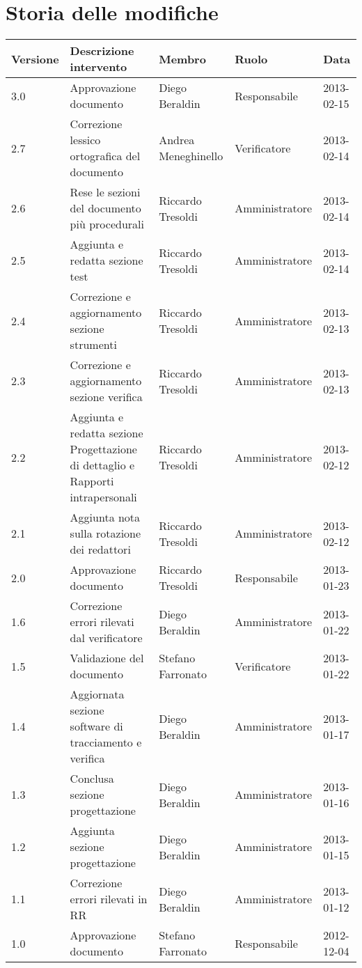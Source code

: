 \section*{Storia delle modifiche}
\begin{tabularx}{\textwidth}{lXlll}
\toprule
Versione & Descrizione intervento & Membro & Ruolo & Data\\
\midrule %


3.0 & Approvazione documento & Diego Beraldin & Responsabile & 2013-02-15\\
2.7 & Correzione lessico ortografica del documento & Andrea Meneghinello & Verificatore & 2013-02-14\\
2.6 & Rese le sezioni del documento più procedurali & Riccardo Tresoldi & Amministratore & 2013-02-14\\
2.5 & Aggiunta e redatta sezione test & Riccardo Tresoldi & Amministratore & 2013-02-14\\
2.4 & Correzione e aggiornamento sezione strumenti & Riccardo Tresoldi & Amministratore & 2013-02-13\\
2.3 & Correzione e aggiornamento sezione verifica & Riccardo Tresoldi & Amministratore & 2013-02-13\\
2.2 & Aggiunta e redatta sezione Progettazione di dettaglio e Rapporti intrapersonali & Riccardo Tresoldi & Amministratore & 2013-02-12\\
2.1 & Aggiunta nota sulla rotazione dei redattori & Riccardo Tresoldi & Amministratore & 2013-02-12\\
2.0 & Approvazione documento & Riccardo Tresoldi & Responsabile & 2013-01-23\\
1.6 & Correzione errori rilevati dal verificatore & Diego Beraldin & Amministratore & 2013-01-22\\
1.5 & Validazione del documento & Stefano Farronato & Verificatore & 2013-01-22\\
1.4 & Aggiornata sezione software di tracciamento e verifica & Diego Beraldin & Amministratore & 2013-01-17\\
1.3 & Conclusa sezione progettazione & Diego Beraldin & Amministratore & 2013-01-16\\
1.2 & Aggiunta sezione progettazione & Diego Beraldin & Amministratore & 2013-01-15\\
1.1 & Correzione errori rilevati in RR & Diego Beraldin & Amministratore & 2013-01-12\\
1.0 & Approvazione documento & Stefano Farronato & Responsabile & 2012-12-04\\

\end{tabularx}
